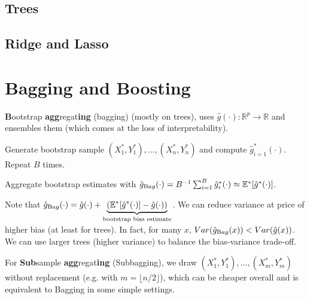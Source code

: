 \subsection{Trees}%
\label{sub:trees}

\subsection{Ridge and Lasso}%
\label{sub:ridge_and_lasso}


\section{Bagging and Boosting}\label{sec:bagging_and_boosting}
\begin{sectionbox}\nospacing{}
  \textbf{B}ootstrap \textbf{agg}regat\textbf{ing} (bagging) (mostly on trees), uses $\hat g(\cdot): \mathbb{R}^{p}\to \mathbb{R}$ and ensembles them (which comes at the loss of interpretability).
  \begin{enumeratenosep}[label=\roman*]
    \item Generate bootstrap sample $(X_{1}^{\ast}, Y_{1}^{\ast}), \dots, (X_{n}^{\ast}, Y_{n}^{\ast})$ and compute $\hat{g}^{\ast}_{i=1}(\cdot)$. Repeat $B$ times.
    \item Aggregate bootstrap estimates with $\hat{g}_{\textrm Bag}(\cdot) = B^{-1}\sum_{i=1}^{B} \hat{g}^{\ast}_{i}(\cdot) \approx \mathbb{E}^{\ast}[\hat{g}^{\ast}(\cdot)]$.
  \end{enumeratenosep}
  Note that $\hat{g}_{\textrm Bag}(\cdot) = \hat{g}(\cdot) + \underbrace{(\mathbb{E}^{\ast}[\hat{g}^{\ast}(\cdot)] -\hat{g}(\cdot))}_{\text{bootstrap bias estimate}}$.
  We can reduce variance at price of higher bias (at least for trees).
  In fact, for many $x$, $Var(\hat{g}_{\textrm Bag}(x)) < Var(\hat{g}(x))$. We can use larger trees (higher variance) to balance the bias-variance trade-off.

  For \textbf{Sub}sample \textbf{agg}regat\textbf{ing} (Subbagging), we draw $(X_{1}^{\ast}, Y_{1}^{\ast}), \dots, (X_{m}^{\ast}, Y_{m}^{\ast})$ without replacement (e.g. with $m = \lfloor n/2\rfloor$), which can be cheaper overall and is equivalent to Bagging in some simple settings.
\end{sectionbox}

